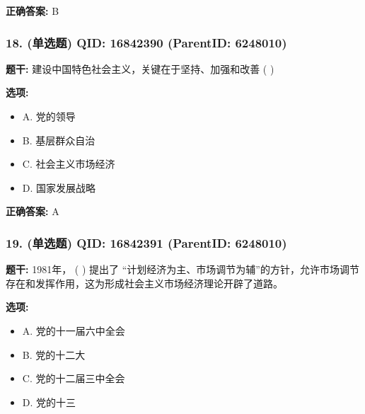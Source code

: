 \documentclass[12pt,UTF8]{ctexart}
\begin{document}
\textbf{正确答案:}
B

\vspace{0.3em}\hrulefill\vspace{0.7em}

\subsubsection*{18. (单选题) \small QID: 16842390 (ParentID: 6248010)}

\textbf{题干:}
建设中国特色社会主义，关键在于坚持、加强和改善 ( )



\textbf{选项:}
\begin{itemize}[leftmargin=*]

  \item A. 党的领导

  \item B. 基层群众自治

  \item C. 社会主义市场经济

  \item D. 国家发展战略

\end{itemize}

\textbf{正确答案:}
A

\vspace{0.3em}\hrulefill\vspace{0.7em}

\subsubsection*{19. (单选题) \small QID: 16842391 (ParentID: 6248010)}

\textbf{题干:}
1981年， ( ) 提出了 “计划经济为主、市场调节为辅”的方针，允许市场调节存在和发挥作用，这为形成社会主义市场经济理论开辟了道路。



\textbf{选项:}
\begin{itemize}[leftmargin=*]

  \item A. 党的十一届六中全会

  \item B. 党的十二大

  \item C. 党的十二届三中全会

  \item D. 党的十三

\end{itemize}
\end{document}
